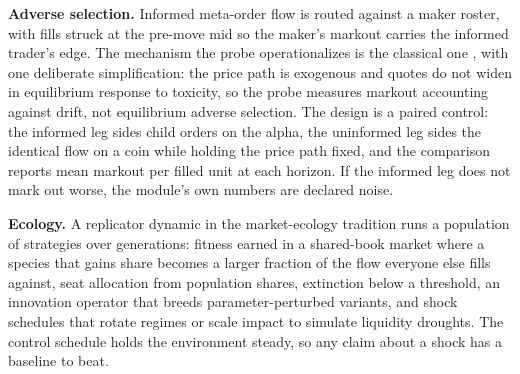 \textbf{Adverse selection.} Informed meta-order flow is routed against a maker roster, with fills struck at the pre-move mid so the maker's markout carries the informed trader's edge. The mechanism the probe operationalizes is the classical one \citep{glosten1985bid}, with one deliberate simplification: the price path is exogenous and quotes do not widen in equilibrium response to toxicity, so the probe measures markout accounting against drift, not equilibrium adverse selection. The design is a paired control: the informed leg sides child orders on the alpha, the uninformed leg sides the identical flow on a coin while holding the price path fixed, and the comparison reports mean markout per filled unit at each horizon. If the informed leg does not mark out worse, the module's own numbers are declared noise.

\textbf{Ecology.} A replicator dynamic in the market-ecology tradition \citep{farmer2002market,lux1999scaling} runs a population of strategies over generations: fitness earned in a shared-book market where a species that gains share becomes a larger fraction of the flow everyone else fills against, seat allocation from population shares, extinction below a threshold, an innovation operator that breeds parameter-perturbed variants, and shock schedules that rotate regimes or scale impact to simulate liquidity droughts. The control schedule holds the environment steady, so any claim about a shock has a baseline to beat.
